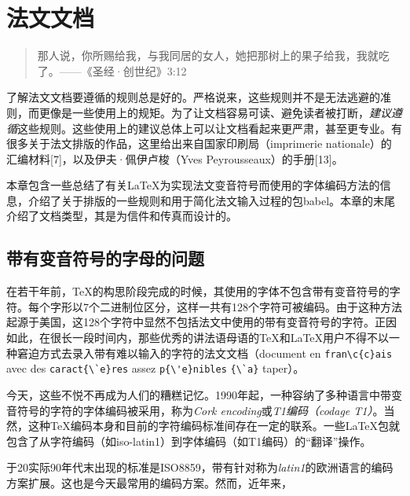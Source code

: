 \chapter{法文文档}

\begin{quote}
    那人说，你所赐给我，与我同居的女人，她把那树上的果子给我，我就吃了。——《圣经·创世纪》3:12
\end{quote}

了解法文文档要遵循的规则总是好的。严格说来，这些规则并不是无法逃避的准则，而更像是一些使用上的规矩。为了让文档容易可读、避免读者被打断，\emph{建议遵循}这些规则。这些使用上的建议总体上可以让文档看起来更严肃，甚至更专业。有很多关于法文排版的作品，这里给出来自国家印刷局（imprimerie nationale）的汇编材料[7]，以及伊夫·佩伊卢梭（Yves Peyrousseaux）的手册[13]。

本章包含一些总结了有关\LaTeX 为实现法文变音符号而使用的字体编码方法的信息，介绍了关于排版的一些规则和用于简化法文输入过程的包\textsf{babel}。本章的末尾介绍了文档类型，其是为信件和传真而设计的。

\section{带有变音符号的字母的问题}

在若干年前，\TeX 的构思阶段完成的时候，其使用的字体不包含带有变音符号的字符。每个字形以7个二进制位区分，这样一共有128个字符可被编码。由于这种方法起源于美国，这128个字符中显然不包括法文中使用的带有变音符号的字符。正因如此，在很长一段时间内，那些优秀的讲法语母语的\TeX 和\LaTeX 用户不得不以一种窘迫方式去录入带有难以输入的字符的法文文档（document en \verb+fran\c{c}ais+ avec des \verb+caract{\`e}res+ assez \verb+p{\'e}nibles+ \verb+{\`a}+ taper）。

今天，这些不悦不再成为人们的糟糕记忆。1990年起，一种容纳了多种语言中带变音符号的字符的字体编码被采用，称为\emph{Cork encoding}或\emph{T1编码（codage T1）}。当然，这种\TeX 编码本身和目前的字符编码标准间存在一定的联系。一些\LaTeX 包就包含了从字符编码（如iso-latin1）到字体编码（如T1编码）的“翻译”操作。

\begin{exclamation}
    于20实际90年代末出现的标准是ISO8859，带有针对称为\emph{latin1}的欧洲语言的编码方案扩展。这也是今天最常用的编码方案。然而，近年来，
\end{exclamation}